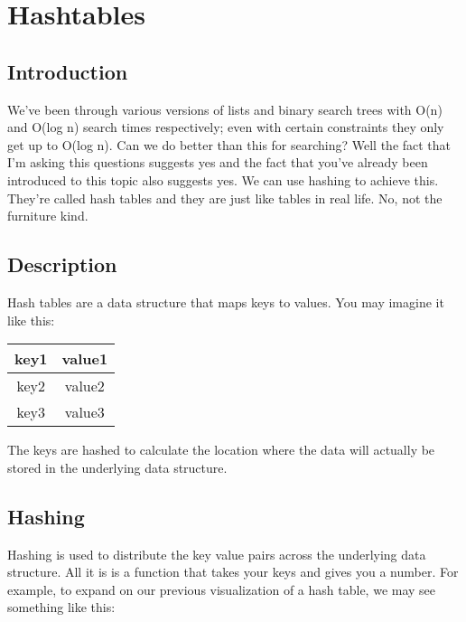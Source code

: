 \documentclass[11pt]{book}
\begin{document}
	\setcounter{chapter}{5}
	\chapter{Hashtables}
	\section{Introduction}
		We've been through various versions of lists and binary search trees with O(n) and
		O(log n) search times respectively; even with certain constraints they only get up
		to O(log n). Can we do better than this for searching? Well the fact that I'm
		asking this questions suggests yes and the fact that you've already been introduced
		to this topic also suggests yes. We can use hashing to achieve this. They're called
		hash tables and they are just like tables in real life. No, not the furniture kind.

	\section{Description}
		Hash tables are a data structure that maps keys to values. You may imagine it like
		this:

		\begin{center}
			\begin{tabular}{|c|c|}
				\hline
				key1 & value1 \\
				\hline
				key2 & value2 \\
				\hline
				key3 & value3 \\
				\hline
			\end{tabular}
		\end{center}

		\noindent The keys are hashed to calculate the location where the data will
		actually be stored in the underlying data structure.

	\section{Hashing}
		Hashing is used to distribute the key value pairs across the underlying data
		structure. All it is is a function that takes your keys and gives you a number.
		For example, to expand on our previous visualization of a hash table, we may
		see something like this:
\end{document}
